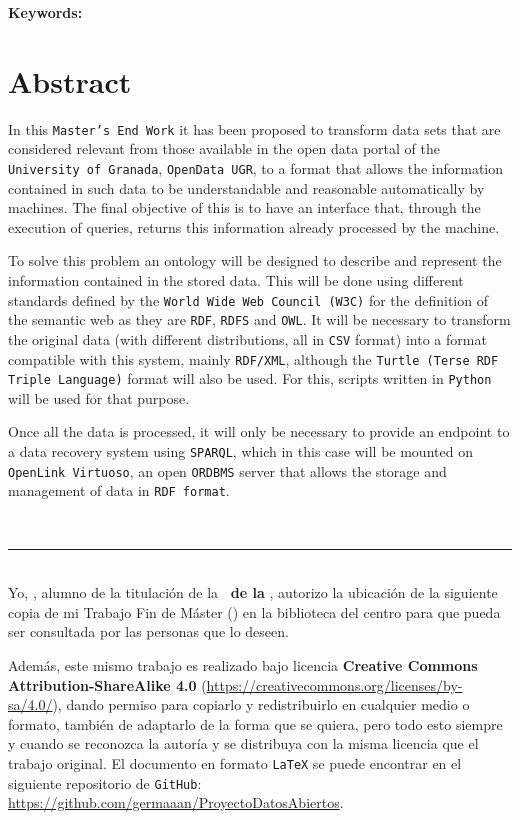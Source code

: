 \textbf{Keywords: }{\keywordsEn}

\section*{Abstract}

In this {\tt Master's End Work} it has been proposed to transform data sets that are considered relevant from those available in the open data portal of the {\tt University of Granada}, {\tt OpenData UGR}, to a format that allows the information contained in such data to be understandable and reasonable automatically by machines. The final objective of this is to have an interface that, through the execution of queries, returns this information already processed by the machine.
\bigskip

To solve this problem an ontology will be designed to describe and represent the information contained in the stored data. This will be done using different standards defined by the {\tt World Wide Web Council (W3C)} for the definition of the semantic web as they are {\tt RDF}, {\tt RDFS} and {\tt OWL}. It will be necessary to transform the original data (with different distributions, all in {\tt CSV} format) into a format compatible with this system, mainly {\tt RDF/XML}, although the {\tt Turtle (Terse RDF Triple Language)} format will also be used. For this, scripts written in {\tt Python} will be used for that purpose.

\bigskip
Once all the data is processed, it will only be necessary to provide an endpoint to a data recovery system using {\tt SPARQL}, which in this case will be mounted on {\tt OpenLink Virtuoso}, an open {\tt ORDBMS} server that allows the storage and management of data in {\tt RDF format}.

\newpage
\thispagestyle{empty}
\
\vspace{3cm}

\noindent\rule[-1ex]{\textwidth}{2pt}\\[4.5ex]

Yo, \textbf{\autor}, alumno de la titulación \textbf{\master} de la \textbf{\escuela\ de la \universidad}, autorizo la ubicación de la siguiente copia de mi Trabajo Fin de Máster (\textit{\titulo}) en la biblioteca del centro para que pueda ser consultada por las personas que lo deseen.

\bigskip
Además, este mismo trabajo es realizado bajo licencia \textbf{Creative Commons Attribution-ShareAlike 4.0} (\url{https://creativecommons.org/licenses/by-sa/4.0/}), dando permiso para copiarlo y redistribuirlo en cualquier medio o formato, también de adaptarlo de la forma que se quiera, pero todo esto siempre y cuando se reconozca la autoría y se distribuya con la misma licencia que el trabajo original. El documento en formato {\tt LaTeX} se puede encontrar en el siguiente repositorio de {\tt GitHub}: \url{https://github.com/germaaan/ProyectoDatosAbiertos}.

